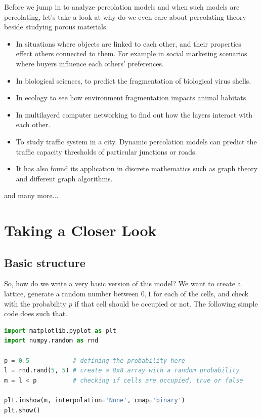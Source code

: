 \documentclass[compress]{beamer}
\begin{document}
\begin{frame}
    \small

    Before we jump in to analyze percolation models and when such models are percolating,
    let's take a look at why do we even care about percolating theory beside studying
    porous materials.

    \begin{itemize}[left=0pt,label=\(\square\)]
        \item In situations where objects are linked to each other, and their properties
            effect others connected to them. For example in social marketing scenarios
            where buyers influence each others' preferences.
        \item In biological sciences, to predict the fragmentation of biological virus
            shells.
        \item In ecology to see how environment fragmentation impacts animal habitats.
        \item In multilayerd computer networking to find out how the layers interact with
            each other.
        \item To study traffic system in a city. Dynamic percolation models can predict
            the traffic capacity thresholds of particular junctions or roads.
        \item It has also found its application in discrete mathematics such as graph
            theory and different graph algorithms.
    \end{itemize}

    and many more...

    \normalsize
\end{frame}

\section{Taking a Closer Look}

\subsection{Basic structure}

\begin{frame}[fragile]
    So, how do we write a very basic version of this model? We want to create a lattice,
    generate a random number between \(0, 1\) for each of the cells, and check with the
    probability \(p\) if that cell should be occupied or not. The following simple code
    does such that.

    \vspace{10pt}

    \begin{lstlisting}[language=Python]
import matplotlib.pyplot as plt
import numpy.random as rnd

p = 0.5            # defining the probability here
l = rnd.rand(5, 5) # create a 8x8 array with a random probability
m = l < p          # checking if cells are occupied, true or false

plt.imshow(m, interpolation='None', cmap='binary')
plt.show()
    \end{lstlisting}
\end{frame}
\end{document}
